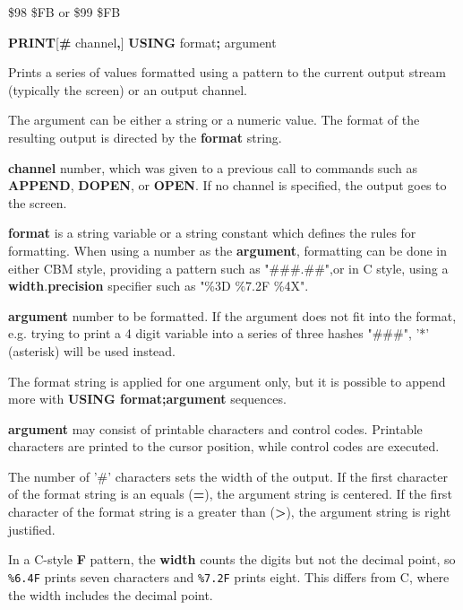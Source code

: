 \begin{description}[leftmargin=2cm,style=nextline]
\item [Token:]    \$98 \$FB or \$99 \$FB

\item [Format:]   {\bf PRINT}[{\bf\#} channel{\bf,}] {\bf USING} format{\bf;} argument

\item [Usage:]    Prints a series of values formatted using a pattern to the current output stream (typically the screen) or an output channel.

                  The argument can be either a string or a numeric value. The format of the resulting output is directed by the {\bf format} string.

                  {\bf channel} number, which was given to a previous call to commands such as {\bf APPEND}, {\bf DOPEN}, or {\bf OPEN}. If no channel is specified, the output goes to the screen.

                  {\bf format} is a string variable or a string constant which defines the rules for formatting. When using a number as the {\bf argument}, formatting can be done in either CBM style, providing a pattern such as "\#\#\#.\#\#",or in C style, using a {\bf width}.{\bf precision} specifier such as "\%3D \%7.2F \%4X".

                  {\bf argument} number to be formatted. If the argument does not fit into the format, e.g. trying to print a 4 digit variable into a series of three hashes "\#\#\#", '*' (asterisk) will be used instead.

\item [Remarks:]  The format string is applied for one argument only, but it is possible to append more with {\bf USING format;argument} sequences.

                  {\bf argument} may consist of printable characters and control codes. Printable characters are printed to the cursor position, while control codes are executed.

                  The number of '\#' characters sets the width of the output. If the first character of the format string is an equals ({\bf =}), the argument string is centered. If the first character of the format string is a greater than ({\bf >}), the argument string is right justified.

                  In a C-style {\bf F} pattern, the {\bf width} counts the digits but not the decimal point, so \texttt{\%6.4F} prints seven characters and \texttt{\%7.2F} prints eight. This differs from C, where the width includes the decimal point.


\end{description}
